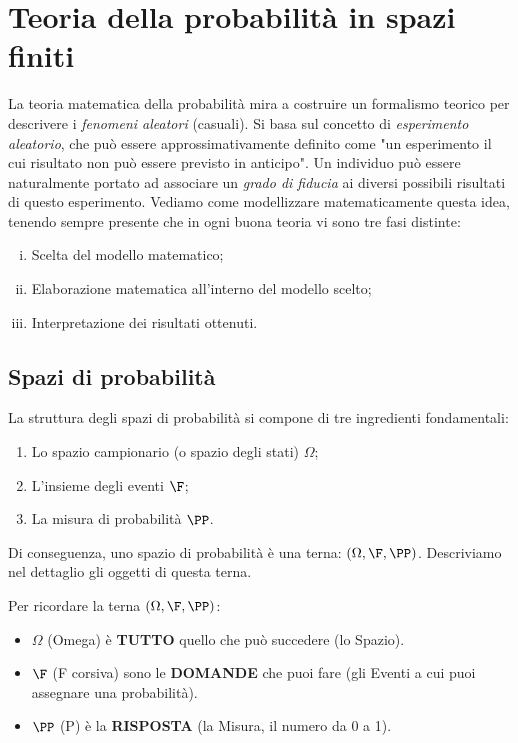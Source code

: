 \chapter{Teoria della probabilità in spazi finiti}

La teoria matematica della probabilità mira a costruire un formalismo teorico per descrivere i \emph{fenomeni aleatori} (casuali). Si basa sul concetto di \emph{esperimento aleatorio}, che può essere approssimativamente definito come "un esperimento il cui risultato non può essere previsto in anticipo". Un individuo può essere naturalmente portato ad associare un \emph{grado di fiducia} ai diversi possibili risultati di questo esperimento. Vediamo come modellizzare matematicamente questa idea, tenendo sempre presente che in ogni buona teoria vi sono tre fasi distinte:
\begin{enumerate}[(i)]
    \item Scelta del modello matematico;
    \item Elaborazione matematica all'interno del modello scelto;
    \item Interpretazione dei risultati ottenuti.
\end{enumerate}

\section{Spazi di probabilità}

La struttura degli spazi di probabilità si compone di tre ingredienti fondamentali:
\begin{enumerate}
    \item Lo spazio campionario (o spazio degli stati) $\Omega$;
    \item L'insieme degli eventi $\F$;
    \item La misura di probabilità $\PP$.
\end{enumerate}
Di conseguenza, uno spazio di probabilità è una terna: $(\Omega, \F, \PP)$. Descriviamo nel dettaglio gli oggetti di questa terna.

\begin{hint}
    Per ricordare la terna $(\Omega, \F, \PP)$:
    \begin{itemize}
        \item $\Omega$ (Omega) è \textbf{TUTTO} quello che può succedere (lo Spazio).
        \item $\F$ (F corsiva) sono le \textbf{DOMANDE} che puoi fare (gli Eventi a cui puoi assegnare una probabilità).
        \item $\PP$ (P) è la \textbf{RISPOSTA} (la Misura, il numero da 0 a 1).
    \end{itemize}
\end{hint}


